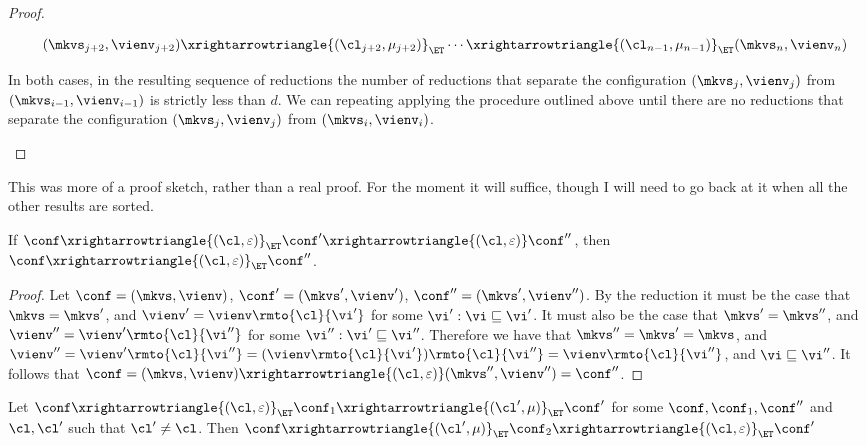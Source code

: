 \begin{proof}
\begin{enumerate}
\begin{itemize}
\[\begin{array}{@{}l@{}}
\quad (\mkvs_{j+2}, \vienv_{j+2}) \xrightarrowtriangle{(\cl_{j+2}, \mu_{j+2})}_{\ET} \cdots 
\xrightarrowtriangle{(\cl_{n-1}, \mu_{n-1})}_{\ET} (\mkvs_{n}, \vienv_{n})
\end{array}
\]
\end{itemize}
In both cases, in the resulting sequence of reductions the number of reductions that separate 
the configuration $(\mkvs_{j}, \vienv_{j})$ from $(\mkvs_{i-1}, \vienv_{i-1})$ is strictly 
less than $d$. We can repeating applying the procedure outlined above until there are 
no reductions that separate the configuration $(\mkvs_{j}, \vienv_{j})$ from 
$(\mkvs_{i}, \vienv_{i})$.
\end{enumerate}
\end{proof}
\ac{This was more of a proof sketch, rather than a real proof. For the moment it will suffice, though 
I will need to go back at it when all the other results are sorted.}


\begin{lemma}[Absorption]
\label{lem:et.absorb}
If $\conf \xrightarrowtriangle{(\cl, \varepsilon)}_{\ET} \conf' \xrightarrowtriangle{(\cl, \varepsilon)} \conf''$, then 
$\conf \xrightarrowtriangle{(\cl, \varepsilon)}_{\ET} \conf''$.
\end{lemma}

\begin{proof}
Let $\conf = (\mkvs, \vienv)$, $\conf' = (\mkvs', \vienv')$, $\conf'' = (\mkvs', \vienv'')$. 
By the reduction it must be the case that $\mkvs = \mkvs'$, and $\vienv' = \vienv\rmto{\cl}{\vi'}$ 
for some $\vi' : \vi \sqsubseteq \vi'$. It must also be the case that $\mkvs' = \mkvs''$, and $\vienv'' = \vienv'\rmto{\cl}{\vi''}$ 
for some $\vi'': \vi' \sqsubseteq \vi''$. Therefore we have that $\mkvs'' = \mkvs' = \mkvs$, and 
$\vienv'' = \vienv'\rmto{\cl}{\vi''} = (\vienv\rmto{\cl}{\vi'})\rmto{\cl}{\vi''} = \vienv\rmto{\cl}{\vi''}$, 
and $\vi \sqsubseteq \vi''$. 
It follows that $\conf = (\mkvs, \vienv) \xrightarrowtriangle{(\cl, \varepsilon)} (\mkvs'', \vienv'') = \conf''$.
\end{proof}

\begin{lemma}
\label{lem:viewshift.rightmover}
Let $\conf \xrightarrowtriangle{(\cl, \varepsilon)}_{\ET} \conf_1 \xrightarrowtriangle{(\cl', \mu)}_{\ET} \conf'$ 
for some $\conf, \conf_1, \conf''$ and $\cl, \cl'$ such that $\cl' \neq \cl$. 
Then $\conf \xrightarrowtriangle{(\cl', \mu)}_{\ET} \conf_2 \xrightarrowtriangle{(\cl, \varepsilon)}_{\ET} \conf'$ 
\end{lemma}

